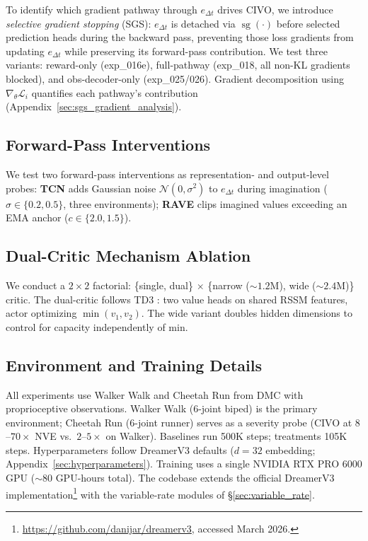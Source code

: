 To identify which gradient pathway through $e_{\Delta t}$ drives CIVO, we introduce \textit{selective gradient stopping} (SGS): $e_{\Delta t}$ is detached via $\operatorname{sg}(\cdot)$ before selected prediction heads during the backward pass, preventing those loss gradients from updating $e_{\Delta t}$ while preserving its forward-pass contribution. We test three variants: reward-only (exp\_016e), full-pathway (exp\_018, all non-KL gradients blocked), and obs-decoder-only (exp\_025/026). Gradient decomposition using $\nabla_\theta \mathcal{L}_i$ quantifies each pathway's contribution (Appendix~\ref{sec:sgs_gradient_analysis}).

\subsection{Forward-Pass Interventions}
\label{sec:forward_pass_method}

We test two forward-pass interventions as representation- and output-level probes: \textbf{TCN} adds Gaussian noise $\mathcal{N}(0, \sigma^2)$ to $e_{\Delta t}$ during imagination ($\sigma \in \{0.2, 0.5\}$, three environments); \textbf{RAVE} clips imagined values exceeding an EMA anchor ($c \in \{2.0, 1.5\}$).

\subsection{Dual-Critic Mechanism Ablation}
\label{sec:dual_critic_method}

We conduct a $2{\times}2$ factorial: \{single, dual\} $\times$ \{narrow (${\sim}1.2$M), wide (${\sim}2.4$M)\} critic. The dual-critic follows TD3 \citep{fujimoto2018td3}: two value heads on shared RSSM features, actor optimizing $\min(v_1, v_2)$. The wide variant doubles hidden dimensions to control for capacity independently of min.

\subsection{Environment and Training Details}
\label{sec:env_details}

All experiments use Walker Walk and Cheetah Run from DMC \citep{tassa2018dmcontrol} with proprioceptive observations. Walker Walk (6-joint biped) is the primary environment; Cheetah Run (6-joint runner) serves as a severity probe (CIVO at $8$--$70\times$ NVE vs.\ $2$--$5\times$ on Walker). Baselines run 500K steps; treatments 105K steps. Hyperparameters follow DreamerV3 defaults \citep{hafner2025dreamerv3} ($d{=}32$ embedding; Appendix~\ref{sec:hyperparameters}). Training uses a single NVIDIA RTX PRO 6000 GPU (${\sim}80$ GPU-hours total). The codebase extends the official DreamerV3 implementation\footnote{\url{https://github.com/danijar/dreamerv3}, accessed March 2026.} with the variable-rate modules of \S\ref{sec:variable_rate}.
